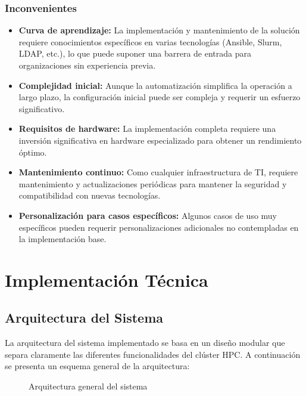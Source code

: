 \documentclass[12pt,a4paper]{report}
\begin{document}
\subsection{Inconvenientes}

\begin{itemize}
    \item \textbf{Curva de aprendizaje:} La implementación y mantenimiento de la solución requiere conocimientos específicos en varias tecnologías (Ansible, Slurm, LDAP, etc.), lo que puede suponer una barrera de entrada para organizaciones sin experiencia previa.
    
    \item \textbf{Complejidad inicial:} Aunque la automatización simplifica la operación a largo plazo, la configuración inicial puede ser compleja y requerir un esfuerzo significativo.
    
    \item \textbf{Requisitos de hardware:} La implementación completa requiere una inversión significativa en hardware especializado para obtener un rendimiento óptimo.
    
    \item \textbf{Mantenimiento continuo:} Como cualquier infraestructura de TI, requiere mantenimiento y actualizaciones periódicas para mantener la seguridad y compatibilidad con nuevas tecnologías.
    
    \item \textbf{Personalización para casos específicos:} Algunos casos de uso muy específicos pueden requerir personalizaciones adicionales no contempladas en la implementación base.
\end{itemize}

\chapter{Implementación Técnica}

\section{Arquitectura del Sistema}

La arquitectura del sistema implementado se basa en un diseño modular que separa claramente las diferentes funcionalidades del clúster HPC. A continuación se presenta un esquema general de la arquitectura:

\begin{figure}[H]
\centering
\caption{Arquitectura general del sistema}
\label{fig:system_architecture}
\end{figure}
\end{document}
